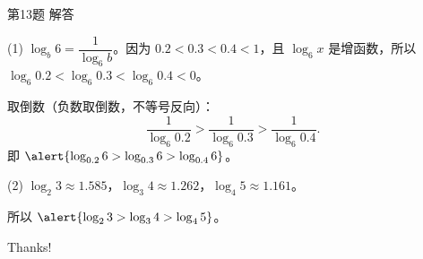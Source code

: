 \documentclass[10pt,aspectratio=169,serif]{beamer}
\begin{document}
\begin{frame}[t]{第13题 解答}
\begin{tcolorbox}[colback=orange!10,colframe=orange,title=\textbf{解}]
(1) $\log_b 6 = \dfrac{1}{\log_6 b}$。因为 $0.2<0.3<0.4<1$，且 $\log_6 x$ 是增函数，所以 $\log_6 0.2 < \log_6 0.3 < \log_6 0.4 < 0$。

取倒数（负数取倒数，不等号反向）：
\[
\frac{1}{\log_6 0.2} > \frac{1}{\log_6 0.3} > \frac{1}{\log_6 0.4}.
\]
即 $\alert{\log_{0.2} 6 > \log_{0.3} 6 > \log_{0.4} 6}$。

(2) $\log_2 3 \approx 1.585$，$\log_3 4 \approx 1.262$，$\log_4 5 \approx 1.161$。

\vspace{0.3em}
所以 $\alert{\log_2 3 > \log_3 4 > \log_4 5}$。
\end{tcolorbox}
\end{frame}

\begin{frame}[c]
  \begin{center}
    {\Huge\calligra Thanks!}
  \end{center}
\end{frame}
\end{document}

